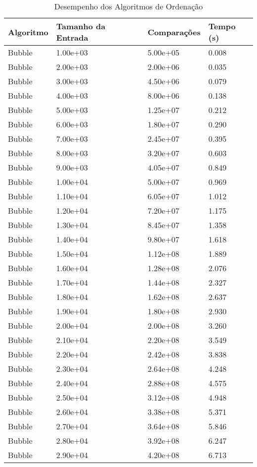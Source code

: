 \begin{table}
\caption{Desempenho dos Algoritmos de Ordenação}
\label{tab:desempenho_algoritmos}
\begin{tabular}{llll}
\toprule
Algoritmo & Tamanho da Entrada & Comparações & Tempo (s) \\
\midrule
Bubble & 1.00e+03 & 5.00e+05 & 0.008 \\
Bubble & 2.00e+03 & 2.00e+06 & 0.035 \\
Bubble & 3.00e+03 & 4.50e+06 & 0.079 \\
Bubble & 4.00e+03 & 8.00e+06 & 0.138 \\
Bubble & 5.00e+03 & 1.25e+07 & 0.212 \\
Bubble & 6.00e+03 & 1.80e+07 & 0.290 \\
Bubble & 7.00e+03 & 2.45e+07 & 0.395 \\
Bubble & 8.00e+03 & 3.20e+07 & 0.603 \\
Bubble & 9.00e+03 & 4.05e+07 & 0.849 \\
Bubble & 1.00e+04 & 5.00e+07 & 0.969 \\
Bubble & 1.10e+04 & 6.05e+07 & 1.012 \\
Bubble & 1.20e+04 & 7.20e+07 & 1.175 \\
Bubble & 1.30e+04 & 8.45e+07 & 1.358 \\
Bubble & 1.40e+04 & 9.80e+07 & 1.618 \\
Bubble & 1.50e+04 & 1.12e+08 & 1.889 \\
Bubble & 1.60e+04 & 1.28e+08 & 2.076 \\
Bubble & 1.70e+04 & 1.44e+08 & 2.327 \\
Bubble & 1.80e+04 & 1.62e+08 & 2.637 \\
Bubble & 1.90e+04 & 1.80e+08 & 2.930 \\
Bubble & 2.00e+04 & 2.00e+08 & 3.260 \\
Bubble & 2.10e+04 & 2.20e+08 & 3.549 \\
Bubble & 2.20e+04 & 2.42e+08 & 3.838 \\
Bubble & 2.30e+04 & 2.64e+08 & 4.248 \\
Bubble & 2.40e+04 & 2.88e+08 & 4.575 \\
Bubble & 2.50e+04 & 3.12e+08 & 4.948 \\
Bubble & 2.60e+04 & 3.38e+08 & 5.371 \\
Bubble & 2.70e+04 & 3.64e+08 & 5.846 \\
Bubble & 2.80e+04 & 3.92e+08 & 6.247 \\
Bubble & 2.90e+04 & 4.20e+08 & 6.713 \\

\end{tabular}
\end{table}
